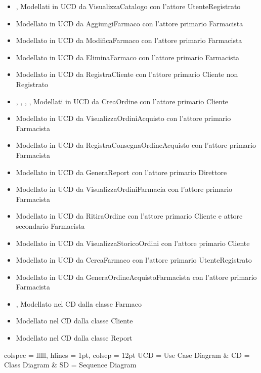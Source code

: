 \begin{itemize}
	\item {},  Modellati in UCD da VisualizzaCatalogo con l'attore UtenteRegistrato
	\item {} Modellato in UCD da AggiungiFarmaco con l'attore primario Farmacista
	\item {} Modellato in UCD da ModificaFarmaco con l'attore primario Farmacista
	\item {} Modellato in UCD da EliminaFarmaco con l'attore primario Farmacista
	\item {} Modellato in UCD da RegistraCliente con l'attore primario Cliente non Registrato
	\item {}, , , ,  Modellati in UCD da CreaOrdine con l'attore primario Cliente
	\item {} Modellato in UCD da VisualizzaOrdiniAcquisto con l'attore primario Farmacista
	\item {} Modellato in UCD da RegistraConsegnaOrdineAcquisto con l'attore primario Farmacista
	\item {} Modellato in UCD da GeneraReport con l'attore primario Direttore
	\item {} Modellato in UCD da VisualizzaOrdiniFarmacia con l'attore primario Farmacista
	\item {} Modellato in UCD da RitiraOrdine con l'attore primario Cliente e attore secondario Farmacista
	\item {} Modellato in UCD da VisualizzaStoricoOrdini con l'attore primario Cliente
	\item {} Modellato in UCD da CercaFarmaco con l'attore primario UtenteRegistrato
	\item {} Modellato in UCD da GeneraOrdineAcquistoFarmacista con l'attore primario Farmacista
	\item {},  Modellato nel CD dalla classe Farmaco
	\item {} Modellato nel CD dalla classe Cliente
	\item {} Modellato nel CD dalla classe Report
\end{itemize}

\begin{table}[!hbp]
	\centering
	\begin{tblr}{
		colspec = lllll,
		hlines = {1pt}, colsep = 12pt
		}
		UCD = Use Case Diagram & CD = Class Diagram & SD = Sequence Diagram \\
	\end{tblr}
\end{table}
